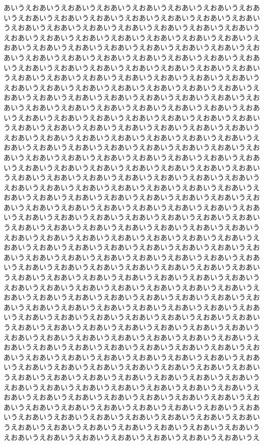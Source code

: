 \documentclass[luatex,fontsize=8pt,paper=b5,twoside,report]{jlreq}%
\begin{document}
あいうえおあいうえおあいうえおあいうえおあいうえおあいうえおあいうえおあいうえおあいうえおあいうえおあいうえおあいうえおあいうえおあいうえおあいうえおあいうえおあいうえおあいうえおあいうえおあいうえおあいうえおあいうえおあいうえおあいうえおあいうえおあいうえおあいうえおあいうえおあいうえおあいうえおあいうえおあいうえおあいうえおあいうえおあいうえおあいうえおあいうえおあいうえおあいうえおあいうえおあいうえおあいうえおあいうえおあいうえおあいうえおあいうえおあいうえおあいうえおあいうえおあいうえおあいうえおあいうえおあいうえおあいうえおあいうえおあいうえおあいうえおあいうえおあいうえおあいうえおあいうえおあいうえおあいうえおあいうえおあいうえおあいうえおあいうえおあいうえおあいうえおあいうえおあいうえおあいうえおあいうえおあいうえおあいうえおあいうえおあいうえおあいうえおあいうえおあいうえおあいうえおあいうえおあいうえおあいうえおあいうえおあいうえおあいうえおあいうえおあいうえおあいうえおあいうえおあいうえおあいうえおあいうえおあいうえおあいうえおあいうえおあいうえおあいうえおあいうえおあいうえおあいうえおあいうえおあいうえおあいうえおあいうえおあいうえおあいうえおあいうえおあいうえおあいうえおあいうえおあいうえおあいうえおあいうえおあいうえおあいうえおあいうえおあいうえおあいうえおあいうえおあいうえおあいうえおあいうえおあいうえおあいうえおあいうえおあいうえおあいうえおあいうえおあいうえおあいうえおあいうえおあいうえおあいうえおあいうえおあいうえおあいうえおあいうえおあいうえおあいうえおあいうえおあいうえおあいうえおあいうえおあいうえおあいうえおあいうえおあいうえおあいうえおあいうえおあいうえおあいうえおあいうえおあいうえおあいうえおあいうえおあいうえおあいうえおあいうえおあいうえおあいうえおあいうえおあいうえおあいうえおあいうえおあいうえおあいうえおあいうえおあいうえおあいうえおあいうえおあいうえおあいうえおあいうえおあいうえおあいうえおあいうえおあいうえおあいうえおあいうえおあいうえおあいうえおあいうえおあいうえおあいうえおあいうえおあいうえおあいうえおあいうえおあいうえおあいうえおあいうえおあいうえおあいうえおあいうえおあいうえおあいうえおあいうえおあいうえおあいうえおあいうえおあいうえおあいうえおあいうえおあいうえおあいうえおあいうえおあいうえおあいうえおあいうえおあいうえおあいうえおあいうえおあいうえおあいうえおあいうえおあいうえおあいうえおあいうえおあいうえおあいうえおあいうえおあいうえおあいうえおあいうえおあいうえおあいうえおあいうえおあいうえおあいうえおあいうえおあいうえおあいうえおあいうえおあいうえおあいうえおあいうえおあいうえおあいうえおあいうえおあいうえおあいうえおあいうえおあいうえおあいうえおあいうえおあいうえおあいうえおあいうえおあいうえおあいうえおあいうえおあいうえおあいうえおあいうえおあいうえおあいうえおあいうえおあいうえおあいうえおあいうえおあいうえおあいうえおあいうえおあいうえおあいうえおあいうえおあいうえおあいうえおあいうえおあいうえおあいうえおあいうえおあいうえおあいうえおあいうえおあいうえおあいうえおあいうえおあいうえおあいうえおあいうえおあいうえおあいうえおあいうえおあいうえおあいうえおあいうえおあいうえおあいうえおあいうえおあいうえおあいうえおあいうえおあいうえおあいうえおあいうえおあいうえおあいうえおあいうえおあいうえおあいうえおあいうえおあいうえおあいうえおあいうえおあいうえおあいうえおあいうえおあいうえおあいうえおあいうえおあいうえおあいうえおあいうえおあいうえ
\end{document}
